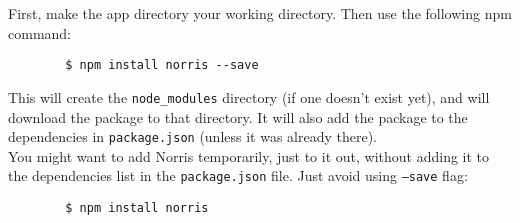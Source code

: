 	First, make the app directory your working directory. Then use the following npm command:
	\begin{lstlisting}
		$ npm install norris --save
	\end{lstlisting}
	This will create the \texttt{node\_modules} directory (if one doesn't exist yet), and will download the package to that directory. It will also add the package to the dependencies in \texttt{package.json} (unless it was already there).\\
	You might want to add Norris temporarily, just to it out, without adding it to the dependencies list in the \texttt{package.json} file. Just avoid using \texttt{--save} flag:
	\begin{lstlisting}
		$ npm install norris
	\end{lstlisting}
